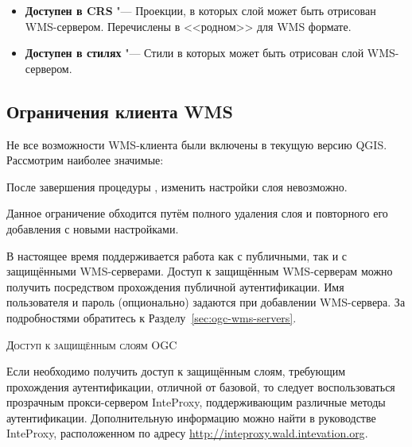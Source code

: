 \begin{itemize}[label=--]
\begin{itemize}[label=--]
\item \textbf{Доступен в CRS}      "--- Проекции, в которых слой может быть отрисован
                                       WMS-сервером. Перечислены в <<родном>>
                                       для WMS формате.

\item \textbf{Доступен в стилях}   "--- Стили в которых может быть отрисован слой
                                       WMS-сервером.

\end{itemize}

\end{itemize}


\subsection{Ограничения клиента WMS}\label{sec:ogc-wms-limits}

Не все возможности WMS-клиента были включены в текущую версию
QGIS. Рассмотрим наиболее значимые:


После завершения процедуры ,
изменить настройки слоя невозможно.

Данное ограничение обходится путём полного удаления слоя и повторного
его добавления с новыми настройками.


В настоящее время поддерживается работа как с публичными, так и с защищёнными
WMS-серверами. Доступ к защищённым WMS-серверам можно получить посредством
прохождения публичной аутентификации.
Имя пользователя и пароль (опционально) задаются при добавлении WMS-сервера.
За подробностями обратитесь к Разделу~\ref{sec:ogc-wms-servers}.

\begin{Tip}[ht]\caption{\textsc{Доступ к защищённым слоям OGC}}
Если необходимо получить доступ к защищённым слоям, требующим прохождения
аутентификации, отличной от базовой, то следует воспользоваться прозрачным
прокси-сервером InteProxy, поддерживающим различные методы
аутентификации. Дополнительную информацию можно найти в руководстве
InteProxy, расположенном по адресу
\url{http://inteproxy.wald.intevation.org}.
\end{Tip}

